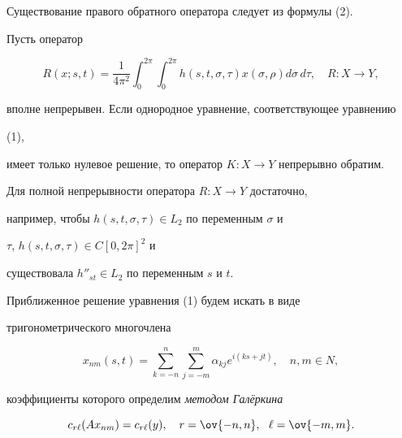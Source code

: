 Существование правого обратного оператора следует из формулы (2). 


 


\begin{cornonum} 


Пусть оператор 


$$ 


R(x;s,t)=\frac{1}{4\pi^2}\int^{2\pi}_0\int^{2\pi}_0 


h(s,t,\sigma,\tau)x(\sigma,\rho)d\sigma\,d\tau,\quad 


R:X\to Y, 


$$ 


вполне непрерывен. Если однородное уравнение, соответствующее уравнению 


(1),  


имеет только нулевое решение, то оператор $K:X\to Y$ непрерывно обратим. 


\end{cornonum} 


 


\begin{notenonum} 


Для полной непрерывности оператора $R:X\to Y$ достаточно,  


например, чтобы $h(s,t,\sigma,\tau)\in L_2$ по переменным $\sigma$ и 


$\tau$, $h(s,t,\sigma,\tau)\in C[0,2\pi]^2$ и  


существовала $h''_{st}\in L_2$ по переменным $s$ и $t$. 


\end{notenonum} 


 


 


Приближенное решение уравнения (1) будем искать в виде  


тригонометрического многочлена 


\begin{equation} 


x_{nm}(s,t)=\sum^n_{k=-n}\sum^m_{j=-m}\alpha_{kj} 


e^{i(ks+jt)},\quad n,m\in N, 


\end{equation} 


коэффициенты которого определим {\it методом Гал\"еркина} 


\begin{equation} 


c_{r\ell}(Ax_{nm})=c_{r\ell}(y),\quad 


r=\ov{-n,n},\ \ \ell=\ov{-m,m}. 


\end{equation} 


